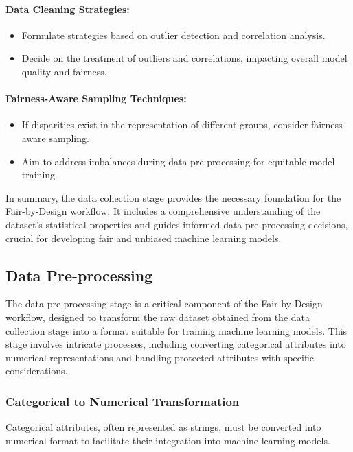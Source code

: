 \paragraph{Data Cleaning Strategies:}
\begin{itemize}
    \item Formulate strategies based on outlier detection and correlation analysis.
    \item Decide on the treatment of outliers and correlations, impacting overall model quality and fairness.
\end{itemize}

\paragraph{Fairness-Aware Sampling Techniques:}
\begin{itemize}
    \item If disparities exist in the representation of different groups, consider fairness-aware sampling.
    \item Aim to address imbalances during data pre-processing for equitable model training.
\end{itemize}

In summary, the data collection stage provides the necessary foundation for the Fair-by-Design workflow. It includes a comprehensive understanding of the dataset's statistical properties and guides informed data pre-processing decisions, crucial for developing fair and unbiased machine learning models.

\subsection{Data Pre-processing}
\label{subsection:data_pre_proc}

The data pre-processing stage is a critical component of the Fair-by-Design workflow, designed to transform the raw dataset obtained from the data collection stage into a format suitable for training machine learning models. This stage involves intricate processes, including converting categorical attributes into numerical representations and handling protected attributes with specific considerations.

\subsubsection{Categorical to Numerical Transformation}

Categorical attributes, often represented as strings, must be converted into numerical format to facilitate their integration into machine learning models.

